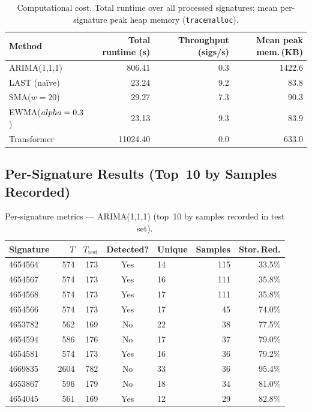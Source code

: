 \documentclass[11pt,a4paper]{article}
\begin{document}
\begin{table}[H]
\centering
\caption{Computational cost. Total runtime over all processed signatures;
  mean per-signature peak heap memory (\texttt{tracemalloc}).}
\label{tab:cost}
\begin{tabular}{lrrr}
\toprule
Method & Total runtime (s) & Throughput (sigs/s) & Mean peak mem.\,(KB) \\
\midrule
ARIMA(1,1,1) & 806.41 & 0.3 & 1422.6 \\
LAST (na\"ive) & 23.24 & 9.2 & 83.8 \\
SMA($w=20$) & 29.27 & 7.3 & 90.3 \\
EWMA($\\alpha=0.3$) & 23.13 & 9.3 & 83.9 \\
Transformer & 11024.40 & 0.0 & 633.0 \\
\bottomrule
\end{tabular}
\end{table}


\subsection{Per-Signature Results (Top~10 by Samples Recorded)}


\begin{table}[H]
\centering
\caption{Per-signature metrics --- ARIMA(1,1,1) (top~10 by samples recorded in test set).}
\label{tab:arima_persig}
\begin{tabular}{lrrclrr}
\toprule
Signature & $T$ & $T_{\mathrm{test}}$ & Detected? & Unique & Samples & Stor.\,Red. \\
\midrule
  4654564 & 574 & 173 & Yes & 14 & 115 & 33.5\% \\
  4654567 & 574 & 173 & Yes & 16 & 111 & 35.8\% \\
  4654568 & 574 & 173 & Yes & 17 & 111 & 35.8\% \\
  4654566 & 574 & 173 & Yes & 17 & 45 & 74.0\% \\
  4653782 & 562 & 169 & No & 22 & 38 & 77.5\% \\
  4654594 & 586 & 176 & No & 17 & 37 & 79.0\% \\
  4654581 & 574 & 173 & Yes & 16 & 36 & 79.2\% \\
  4669835 & 2604 & 782 & No & 33 & 36 & 95.4\% \\
  4653867 & 596 & 179 & No & 18 & 34 & 81.0\% \\
  4654045 & 561 & 169 & Yes & 12 & 29 & 82.8\% \\
\bottomrule
\end{tabular}
\end{table}
\end{document}
